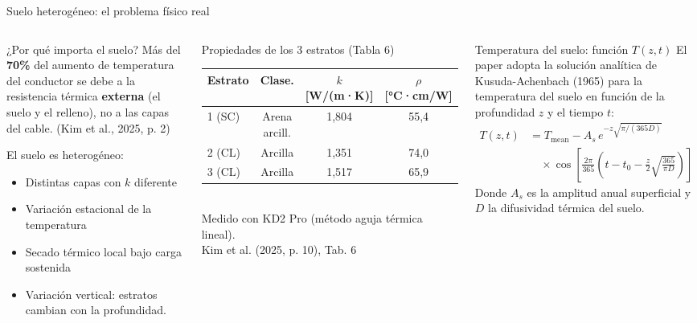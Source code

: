\documentclass[aspectratio=169]{beamer}
\newcommand{\refcite}[1]{{\footnotesize\color{gray!70!black} #1}}
\begin{document}
\begin{frame}{Suelo heterogéneo: el problema físico real}
\begin{columns}[T]
\begin{alertblock}{¿Por qué importa el suelo?}
\scriptsize\justifying
Más del \textbf{70\%} del aumento de temperatura del conductor se debe a
la resistencia térmica \textbf{externa} (el suelo y el relleno), no a las
capas del cable.
\refcite{(Kim et al., 2025, p. 2)}

El suelo es heterogéneo:
\begin{itemize}[leftmargin=*, itemsep=1pt]
  \item Distintas capas con $k$ diferente
  \item Variación estacional de la temperatura
  \item Secado térmico local bajo carga sostenida
  \item Variación vertical: estratos cambian con la profundidad.
\end{itemize}
\end{alertblock}

\vspace{0.1em}
\begin{block}{\small Propiedades de los 3 estratos (Tabla 6)}
\scriptsize
\begin{tabular}{@{}lccc@{}}
\toprule
Estrato & Clase. & $k$ [W/(m·K)] & $\rho$ [°C·cm/W]\\
\midrule
1 (SC) & Arena arcill. & 1,804 & 55,4 \\
2 (CL) & Arcilla & 1,351 & 74,0 \\
3 (CL) & Arcilla & 1,517 & 65,9 \\
\bottomrule
\end{tabular}\\
\tiny Medido con KD2 Pro (método aguja térmica lineal).\\
\refcite{Kim et al. (2025, p. 10), Tab. 6}
\end{block}

\begin{exampleblock}{Temperatura del suelo: función $T(z,t)$}
\scriptsize\justifying
El paper adopta la solución analítica de Kusuda-Achenbach (1965) para la
temperatura del suelo en función de la profundidad $z$ y el tiempo $t$:
\[
\begin{split}
T(z,t) &= T_{\text{mean}} - A_s \, e^{-z\sqrt{\pi/(365D)}} \\
&\quad\times\cos\!\left[\tfrac{2\pi}{365}\!\left(t - t_0
  - \tfrac{z}{2}\sqrt{\tfrac{365}{\pi D}}\right)\right]
\end{split}
\]
Donde $A_s$ es la amplitud anual superficial y $D$ la difusividad
térmica del suelo.
\end{exampleblock}


\end{columns}
\end{frame}
\end{document}
